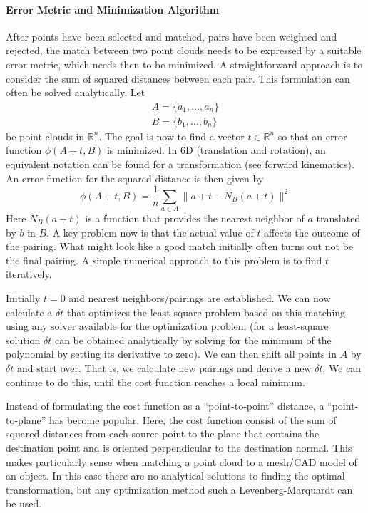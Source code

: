 \paragraph{Error Metric and Minimization Algorithm}
After points have been selected and matched, pairs have been weighted and rejected, the match between two point clouds needs to be expressed by a suitable error metric, which needs then to be minimized. A straightforward approach is to consider the sum of squared distances between each pair. This formulation can often be solved analytically. Let
\begin{eqnarray}
A=\{a_1,\ldots,a_n\}\\
B=\{b_1,\dots,b_n\}
\end{eqnarray}
be point clouds in $ \mathbb{R}^n$. The goal is now to find a vector $ t \in \mathbb{R}^n$ so that an error function $ \phi(A+t,B)$ is minimized. In 6D (translation and rotation), an equivalent notation can be found for a transformation (see forward kinematics). An error function for the squared distance is then given by
\begin{equation}
\phi(A+t,B)=\frac{1}{n}\sum_{a \in A}\|a+t-N_B(a+t)\|^2
\end{equation}
Here $ N_B(a+t)$ is a function that provides the nearest neighbor of $ a$ translated by $ b$ in $ B$.  A key problem now is that the actual value of $t$ affects the outcome of the pairing. What might look like a good match initially often turns out not be the final pairing. A simple numerical approach to this problem is to find $ t$ iteratively.

Initially $t=0$ and nearest neighbors/pairings are established. We can now calculate a $ \delta t$ that optimizes the least-square problem based on this matching using any solver available for the optimization problem (for a least-square solution $ \delta t$ can be obtained analytically by solving for the minimum of the polynomial by setting its derivative to zero). We can then shift all points in $ A$ by $ \delta t$ and start over. That is, we calculate new pairings and derive a new $ \delta t$.  We can continue to do this, until the cost function reaches a local minimum.

Instead of formulating the cost function as a ``point-to-point'' distance, a ``point-to-plane'' has become popular. Here, the cost function consist of the sum of squared distances from each source point to the plane that contains the destination point and is oriented perpendicular to the destination normal. This makes particularly sense when matching a point cloud to a mesh/CAD model of an object. In this case there are no analytical solutions to finding the optimal transformation, but any optimization method such a Levenberg-Marquardt can be used.

